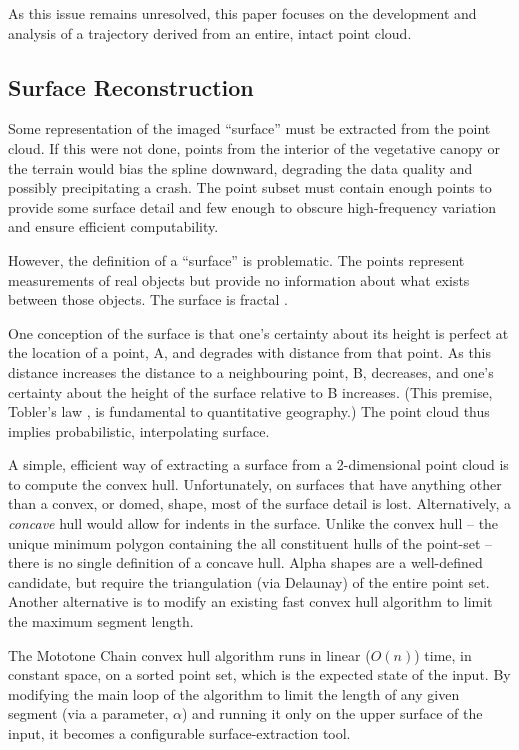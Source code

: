 \documentclass[doc]{apa6}
\begin{document}
As this issue remains unresolved, this paper focuses on the development and analysis of a trajectory derived from an entire, intact point cloud.


\subsection{Surface Reconstruction}

Some representation of the imaged ``surface'' must be extracted from the point cloud. If this were not done, points from the interior of the vegetative canopy or the terrain would bias the spline downward, degrading the data quality and possibly precipitating a crash. The point subset must contain enough points to provide some surface detail and few enough to obscure high-frequency variation and ensure efficient computability. 

However, the definition of a ``surface'' is problematic. The points represent measurements of real objects but provide no information about what exists between those objects. The surface is fractal \parencite{Mandelbrot1967}.

One conception of the surface is that one's  certainty about its height is perfect at the location of a point, A, and degrades with distance from that point. As this distance increases the distance to a neighbouring point, B, decreases, and one's certainty about the height of the surface relative to B increases. (This premise, Tobler's law \parencite{Tobler1970a}, is fundamental to quantitative geography.) The point cloud thus implies probabilistic, interpolating surface. 

A simple, efficient way of extracting a surface from a 2-dimensional point cloud is to compute the convex hull. Unfortunately, on surfaces that have anything other than a convex, or domed, shape, most of the surface detail is lost. Alternatively, a \emph{concave} hull would allow for indents in the surface. Unlike the convex hull -- the unique minimum polygon containing the all constituent hulls of the point-set -- there is no single definition of a concave hull. Alpha shapes \parencite{Edelsbrunner1994} are a well-defined candidate, but require the triangulation (via Delaunay) of the entire point set. Another alternative is to modify an existing fast convex hull algorithm to limit the maximum segment length.

The Mototone Chain convex hull algorithm \parencite{Andrew1979} runs in linear ($O(n)$) time, in constant space, on a sorted point set, which is the expected state of the input. By modifying the main loop of the algorithm to limit the length of any given segment (via a parameter, $\alpha$) and running it only on the upper surface of the input, it becomes a configurable surface-extraction tool. 
\end{document}

